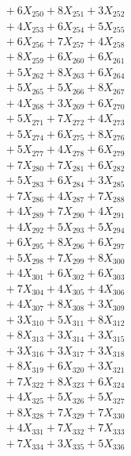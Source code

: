 \documentclass[a4paper,10pt]{article}
\begin{document}
{\begin{align}
&\;  + 6 X_{250} + 8 X_{251} + 3 X_{252} \\[0.3ex]
&\;  + 4 X_{253} + 6 X_{254} + 5 X_{255} \\[0.3ex]
&\;  + 6 X_{256} + 7 X_{257} + 4 X_{258} \\[0.3ex]
&\;  + 8 X_{259} + 6 X_{260} + 6 X_{261} \\[0.3ex]
&\;  + 5 X_{262} + 8 X_{263} + 6 X_{264} \\[0.3ex]
&\;  + 5 X_{265} + 5 X_{266} + 8 X_{267} \\[0.3ex]
&\;  + 4 X_{268} + 3 X_{269} + 6 X_{270} \\[0.3ex]
&\;  + 5 X_{271} + 7 X_{272} + 4 X_{273} \\[0.3ex]
&\;  + 5 X_{274} + 6 X_{275} + 8 X_{276} \\[0.3ex]
&\;  + 5 X_{277} + 4 X_{278} + 6 X_{279} \\[0.5ex]\allowbreak
&\;  + 7 X_{280} + 7 X_{281} + 6 X_{282} \\[0.3ex]
&\;  + 5 X_{283} + 6 X_{284} + 3 X_{285} \\[0.3ex]
&\;  + 7 X_{286} + 4 X_{287} + 7 X_{288} \\[0.3ex]
&\;  + 4 X_{289} + 7 X_{290} + 4 X_{291} \\[0.3ex]
&\;  + 4 X_{292} + 5 X_{293} + 5 X_{294} \\[0.3ex]
&\;  + 6 X_{295} + 8 X_{296} + 6 X_{297} \\[0.3ex]
&\;  + 5 X_{298} + 7 X_{299} + 8 X_{300} \\[0.3ex]
&\;  + 4 X_{301} + 6 X_{302} + 6 X_{303} \\[0.3ex]
&\;  + 7 X_{304} + 4 X_{305} + 4 X_{306} \\[0.3ex]
&\;  + 4 X_{307} + 8 X_{308} + 3 X_{309} \\[0.5ex]\allowbreak
&\;  + 3 X_{310} + 5 X_{311} + 8 X_{312} \\[0.3ex]
&\;  + 8 X_{313} + 3 X_{314} + 3 X_{315} \\[0.3ex]
&\;  + 3 X_{316} + 3 X_{317} + 3 X_{318} \\[0.3ex]
&\;  + 8 X_{319} + 6 X_{320} + 3 X_{321} \\[0.3ex]
&\;  + 7 X_{322} + 8 X_{323} + 6 X_{324} \\[0.3ex]
&\;  + 4 X_{325} + 5 X_{326} + 5 X_{327} \\[0.3ex]
&\;  + 8 X_{328} + 7 X_{329} + 7 X_{330} \\[0.3ex]
&\;  + 4 X_{331} + 7 X_{332} + 7 X_{333} \\[0.3ex]
&\;  + 7 X_{334} + 3 X_{335} + 5 X_{336} \\[0.3ex]

\end{align}}
\end{document}
